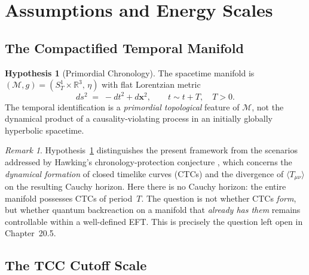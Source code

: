 \documentclass[12pt,openany]{book}
\theoremstyle{plain}
\theoremstyle{definition}
\newtheorem{efthypothesis}[efttheorem]{Hypothesis}
\theoremstyle{remark}
\newtheorem{eftremark}[efttheorem]{Remark}
\providecommand{\vev}[1]{\langle #1 \rangle}
\providecommand{\SoneR}{S^{1}_{T}\!\times\!\mathbb{R}^{3}}
\begin{document}
\section{Assumptions and Energy Scales}
\label{sec:eft-assumptions}

\subsection{The Compactified Temporal Manifold}
\label{sec:eft-manifold}

\begin{efthypothesis}[Primordial Chronology]
\label{hyp:primordial}
The spacetime manifold is
$(\mathcal{M},g) = (\SoneR,\,\eta)$
with flat Lorentzian metric
\begin{equation}\label{eq:eft-metric}
  ds^{2} \;=\; -dt^{2} + d\mathbf{x}^{2},
  \qquad t \sim t + T,\quad T>0.
\end{equation}
The temporal identification is a \emph{primordial topological} feature
of $\mathcal{M}$, not the dynamical product of a causality-violating
process in an initially globally hyperbolic spacetime.
\end{efthypothesis}

\begin{eftremark}
Hypothesis~\ref{hyp:primordial} distinguishes the present framework from
the scenarios addressed by Hawking's chronology-protection conjecture
\cite{Hawking1992}, which concerns the \emph{dynamical formation} of
closed timelike curves (CTCs) and the divergence of
$\vev{T_{\mu\nu}}$ on the resulting Cauchy horizon.
Here there is no Cauchy horizon: the entire manifold possesses CTCs
of period~$T$.  The question is not whether CTCs \emph{form}, but
whether quantum backreaction on a manifold that \emph{already has them}
remains controllable within a well-defined EFT.  This is precisely the
question left open in Chapter~20.5.
\end{eftremark}

\subsection{The TCC Cutoff Scale}
\label{sec:eft-cutoff}
\end{document}
